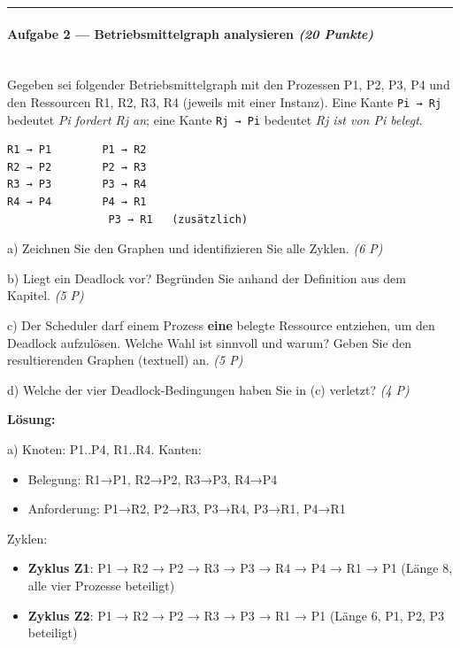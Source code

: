 \documentclass[11pt, a4paper]{article}
\begin{document}
\noindent\textcolor{rulegray}{\rule{\linewidth}{0.4pt}}


\paragraph{Aufgabe 2 — Betriebsmittelgraph analysieren \textit{(20 Punkte)}}\mbox{}\\[2pt]

Gegeben sei folgender Betriebsmittelgraph mit den Prozessen P1, P2, P3, P4 und den Ressourcen R1, R2, R3, R4 (jeweils mit einer Instanz). Eine Kante \texttt{Pi → Rj} bedeutet \textit{Pi fordert Rj an}; eine Kante \texttt{Rj → Pi} bedeutet \textit{Rj ist von Pi belegt}.


\begin{lstlisting}
R1 → P1        P1 → R2
R2 → P2        P2 → R3
R3 → P3        P3 → R4
R4 → P4        P4 → R1
                P3 → R1   (zusätzlich)
\end{lstlisting}


a) Zeichnen Sie den Graphen und identifizieren Sie alle Zyklen. \textit{(6 P)}


b) Liegt ein Deadlock vor? Begründen Sie anhand der Definition aus dem Kapitel. \textit{(5 P)}


c) Der Scheduler darf einem Prozess \textbf{eine} belegte Ressource entziehen, um den Deadlock aufzulösen. Welche Wahl ist sinnvoll und warum? Geben Sie den resultierenden Graphen (textuell) an. \textit{(5 P)}


d) Welche der vier Deadlock-Bedingungen haben Sie in (c) verletzt? \textit{(4 P)}


\textbf{Lösung:}


a) Knoten: P1..P4, R1..R4. Kanten:

\begin{itemize}
  \item Belegung: R1→P1, R2→P2, R3→P3, R4→P4
  \item Anforderung: P1→R2, P2→R3, P3→R4, P3→R1, P4→R1
\end{itemize}

Zyklen:

\begin{itemize}
  \item \textbf{Zyklus Z1}: P1 → R2 → P2 → R3 → P3 → R4 → P4 → R1 → P1 (Länge 8, alle vier Prozesse beteiligt)
  \item \textbf{Zyklus Z2}: P1 → R2 → P2 → R3 → P3 → R1 → P1 (Länge 6, P1, P2, P3 beteiligt)
\end{itemize}
\end{document}
